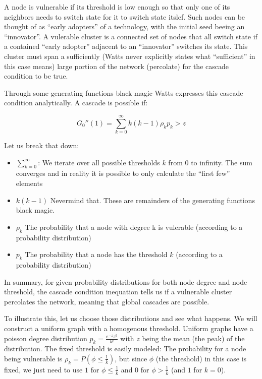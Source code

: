 \documentclass{sig-alternate-05-2015}
\begin{document}
A node is vulnerable if its threshold is low enough so that only one of its neighbors needs to switch state for it to switch state itslef. Such nodes can be thought of as ``early adopters'' of a technology, with the initial seed beeing an ``innovator''. A vulerable cluster is a connected set of nodes that all switch state if a contained ``early adopter'' adjacent to an ``innovator'' switches its state. This cluster must span a sufficiently (Watts never explicitly states what ``sufficient'' in this case means) large portion of the network (percolate) for the cascade condition to be true.

Through some generating functions black magic Watts expresses this cascade condition analytically. A cascade is possible if:

\begin{equation}
  G_0''(1) = \sum_{k=0}^\infty k (k-1) \rho_k p_k > z
\end{equation}

Let us break that down:

\begin{itemize}
  \item $\sum_{k=0}^\infty$: We iterate over all possible thresholds $k$ from $0$ to infinity. The sum converges and in reality it is possible to only calculate the ``first few'' elements
  \item $k (k-1)$ Nevermind that. These are remainders of the generating functions black magic.
  \item $\rho_k$ The probability that a node with degree k is vulerable (according to a probability distribution)
  \item $p_k$ The probability that a node has the threshold $k$ (according to a probability distribution)
\end{itemize}

In summary, for given probability distributions for both node degree and node threshold, the cascade condition inequation tells us if a vulnerable cluster percolates the network, meaning that global cascades are possible.

To illustrate this, let us choose those distributions and see what happens. We will construct a uniform graph with a homogenous threshold. Uniform graphs have a poisson degree distribution $p_k = \frac{e^{-z}z^k}{k!}$ with $z$ being the mean (the peak) of the distribution. The fixed threshold is easily modeled: The probability for a node being vulnerable is $\rho_k = P(\phi \leq \frac{1}{k})$, but since $\phi$ (the threshold) in this case is fixed, we just need to use $1$ for $\phi \leq \frac{1}{k}$ and $0$ for $\phi > \frac{1}{k}$ (and $1$ for $k = 0$).
\end{document}
